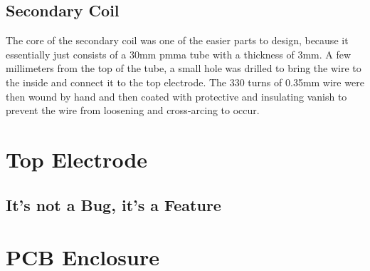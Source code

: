 \subsection{Secondary Coil}

The core of the secondary coil was one of the easier parts to design, because it essentially just consists of a 30mm \gls{pmma} tube with a thickness of 3mm. A few millimeters from the top of the tube, a small hole was drilled to bring the wire to the inside and connect it to the top electrode. The 330 turns of 0.35mm wire were then wound by hand and then coated with protective and insulating vanish to prevent the wire from loosening and cross-arcing to occur.


\section{Top Electrode}

\subsection{It's not a Bug, it's a Feature}


\section{PCB Enclosure}

